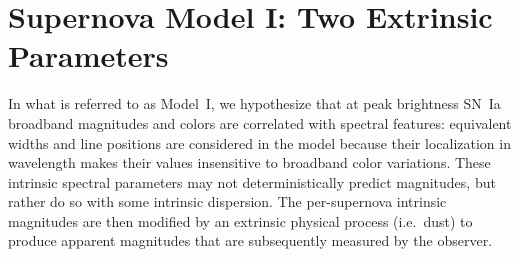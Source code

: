 \documentclass{aastex61}   	%
\begin{document}
\section{Supernova Model I: Two Extrinsic Parameters}
\label{model:sec}

In what is  referred to as Model~I, we hypothesize that at peak brightness
SN~Ia broadband magnitudes and colors are correlated with
spectral features: equivalent widths and line positions are considered in the model because their localization in wavelength
makes their values insensitive to 
broadband color variations.
These intrinsic spectral  parameters may not deterministically predict magnitudes, but rather do so with some intrinsic dispersion.
The per-supernova intrinsic magnitudes are then
modified by an extrinsic physical process (i.e.\ dust) to produce apparent magnitudes that are subsequently measured by the observer.
\end{document}
